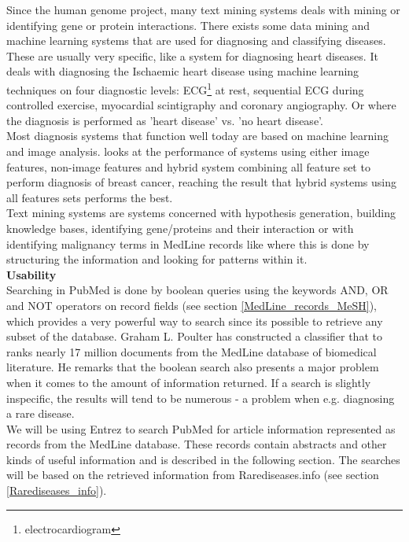 Since the human genome project, many text mining systems deals with
mining or identifying gene or protein interactions. There exists some
data mining and machine learning systems that are used for diagnosing
and classifying diseases. These are usually very specific, like
\cite{DiagnosingIschaemicHeartDiseaseML} a system for diagnosing heart
diseases. It deals with diagnosing the Ischaemic heart disease using
machine learning techniques on four diagnostic levels:
ECG\footnote{electrocardiogram} at rest, sequential ECG during
controlled exercise, myocardial scintigraphy and coronary
angiography. Or \cite{SVMHeartDiseaseClassification} where the
diagnosis is performed as 'heart disease' vs. 'no heart disease'.\\

Most diagnosis systems that function well today are based on machine
learning and image analysis. \cite{Wang1999115} looks at the
performance of systems using either image features, non-image features
and hybrid system combining all feature set to perform diagnosis of
breast cancer, reaching the result that hybrid systems using all
features sets performs the best.\\

Text mining systems are systems concerned with hypothesis generation,
building knowledge bases, identifying gene/proteins and their
interaction or with identifying malignancy terms in MedLine records
like \cite{AutomatedMalignancyRecognition} where this is done by
structuring the information and looking for patterns within it. \\

\textbf{Usability} \\ Searching in PubMed is done by boolean queries
using the keywords AND, OR and NOT operators on record fields (see
section \ref{MedLine_records_MeSH}), which provides a very powerful
way to search since its possible to retrieve any subset of the
database. Graham L. Poulter \cite{RapidClassification} has constructed
a classifier that to ranks nearly 17 million documents from the
MedLine database of biomedical literature. He remarks that the boolean
search also presents a major problem when it comes to the amount of
information returned. If a search is slightly inspecific, the results
will tend to be numerous - a problem when e.g. diagnosing a rare
disease.\\

We will be using Entrez to search PubMed for article information
represented as records from the MedLine database. These records
contain abstracts and other kinds of useful information and is
described in the following section. The searches will be based on the
retrieved information from Rarediseases.info
(see section \ref{Rarediseases_info}).  \\

